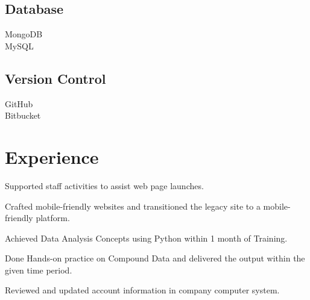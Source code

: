 \documentclass[]{deedy-resume-openfont}
\begin{document}
\begin{minipage}[t]{0.33\textwidth}
\subsection{Database}
\textbullet{} MongoDB \\
\textbullet{} MySQL
\subsection{Version Control}
\textbullet{} GitHub \\
\textbullet{} Bitbucket
\sectionsep

%
%

\end{minipage} 
\hfill
\begin{minipage}[t]{0.66\textwidth} 


\section{Experience}
\sectionsep

\vspace{\topsep} %
\begin{tightemize}
\item Supported staff activities to assist web page launches.
\item Crafted mobile-friendly websites and transitioned the legacy site to a mobile-friendly platform.
\end{tightemize}

\begin{tightemize}
\item Achieved Data Analysis Concepts using Python within 1 month of Training.
\item Done Hands-on practice on Compound Data and delivered the output within the given time period.
\item Reviewed and updated account information in company computer system.
\end{tightemize}
\sectionsep




\end{minipage}
\end{document}
